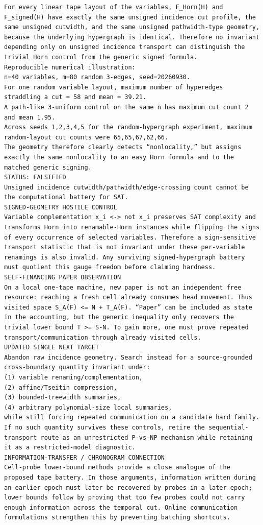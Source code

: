 \documentclass[11pt]{article}
\begin{document}
\begin{Verbatim}[breaklines=true,breakanywhere=true]
For every linear tape layout of the variables, F_Horn(H) and F_signed(H) have exactly the same unsigned incidence cut profile, the same unsigned cutwidth, and the same unsigned pathwidth-type geometry, because the underlying hypergraph is identical. Therefore no invariant depending only on unsigned incidence transport can distinguish the trivial Horn control from the generic signed formula.
Reproducible numerical illustration:
n=40 variables, m=80 random 3-edges, seed=20260930.
For one random variable layout, maximum number of hyperedges straddling a cut = 58 and mean = 39.21.
A path-like 3-uniform control on the same n has maximum cut count 2 and mean 1.95.
Across seeds 1,2,3,4,5 for the random-hypergraph experiment, maximum random-layout cut counts were 65,65,67,62,66.
The geometry therefore clearly detects “nonlocality,” but assigns exactly the same nonlocality to an easy Horn formula and to the matched generic signing.
STATUS: FALSIFIED
Unsigned incidence cutwidth/pathwidth/edge-crossing count cannot be the computational battery for SAT.
SIGNED-GEOMETRY HOSTILE CONTROL
Variable complementation x_i <-> not x_i preserves SAT complexity and transforms Horn into renamable-Horn instances while flipping the signs of every occurrence of selected variables. Therefore a sign-sensitive transport statistic that is not invariant under these per-variable renamings is also invalid. Any surviving signed-hypergraph battery must quotient this gauge freedom before claiming hardness.
SELF-FINANCING PAPER OBSERVATION
On a local one-tape machine, new paper is not an independent free resource: reaching a fresh cell already consumes head movement. Thus visited space S_A(F) <= N + T_A(F). “Paper” can be included as state in the accounting, but the generic inequality only recovers the trivial lower bound T >= S-N. To gain more, one must prove repeated transport/communication through already visited cells.
UPDATED SINGLE NEXT TARGET
Abandon raw incidence geometry. Search instead for a source-grounded cross-boundary quantity invariant under:
(1) variable renaming/complementation,
(2) affine/Tseitin compression,
(3) bounded-treewidth summaries,
(4) arbitrary polynomial-size local summaries,
while still forcing repeated communication on a candidate hard family.
If no such quantity survives these controls, retire the sequential-transport route as an unrestricted P-vs-NP mechanism while retaining it as a restricted-model diagnostic.
INFORMATION-TRANSFER / CHRONOGRAM CONNECTION
Cell-probe lower-bound methods provide a close analogue of the proposed tape battery. In those arguments, information written during an earlier epoch must later be recovered by probes in a later epoch; lower bounds follow by proving that too few probes could not carry enough information across the temporal cut. Online communication formulations strengthen this by preventing batching shortcuts.

\end{Verbatim}
\end{document}
